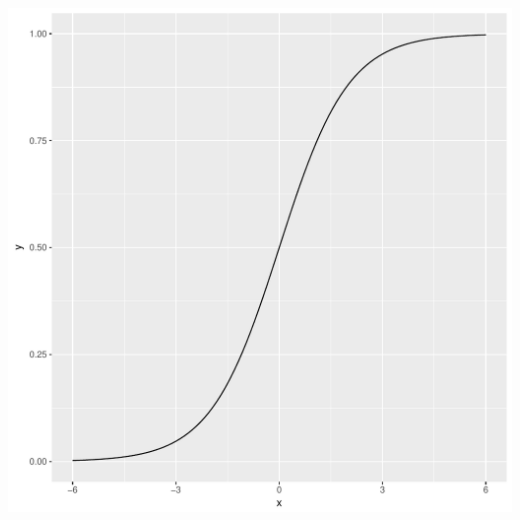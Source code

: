 \documentclass[12pt,oneside]{book}\usepackage[]{graphicx}\usepackage[]{color}
\makeatletter
\def\maxwidth{ %
  \ifdim\Gin@nat@width>\linewidth
    \linewidth
  \else
    \Gin@nat@width
  \fi
}
\newenvironment{knitrout}{}{} %
\makeatother
\begin{document}
{\begin{knitrout}
\includegraphics[width=\maxwidth]{figure/unnamed-chunk-219-1} 


\end{knitrout}}
\end{document}
